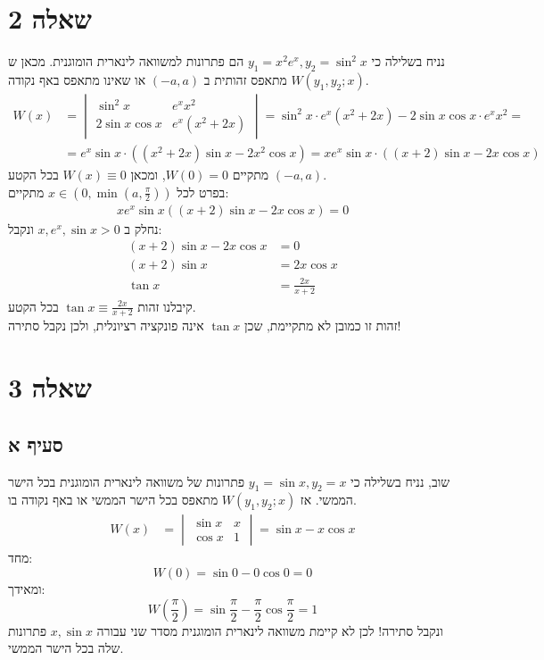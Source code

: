 \documentclass{article}
\begin{document}
\section*{שאלה 2}

נניח בשלילה כי $y_1=x^2e^x, y_2=\sin^2x$ הם פתרונות למשוואה לינארית הומוגנית. מכאן ש $W(y_1,y_2;x)$ מתאפס זהותית ב $(-a,a)$ או שאינו מתאפס באף נקודה.
\begin{align*}
    W(x) & =\begin{vmatrix}
                \sin^2x        & e^xx^2      \\
                2\sin x \cos x & e^x(x^2+2x)
            \end{vmatrix}
    = \sin^2x \cdot e^x(x^2+2x) - 2\sin x \cos x \cdot e^xx^2 =                                      \\
         & = e^x \sin x \cdot ((x^2+2x)\sin x-2x^2\cos x) =xe^x\sin x \cdot ((x+2)\sin x - 2x\cos x)
\end{align*}
מתקיים $W(0)=0$, ומכאן $W(x)\equiv 0$ בכל הקטע $(-a,a)$.\\
בפרט לכל $x\in(0,\min(a, \frac{\pi}{2}))$ מתקיים:
\begin{align*}
    xe^x\sin x ((x+2)\sin x - 2x \cos x) = 0
\end{align*}
נחלק ב $x,e^x,\sin x > 0$ ונקבל:
\begin{align*}
    (x+2)\sin x -2x\cos x & = 0              \\
    (x+2)\sin x           & = 2x\cos x       \\
    \tan x                & = \frac{2x}{x+2}
\end{align*}
קיבלנו זהות $\tan x \equiv \frac{2x}{x+2}$ בכל הקטע. \\
זהות זו כמובן לא מתקיימת, שכן $\tan x$ אינה פונקציה רציונלית, ולכן נקבל סתירה!

\pagebreak

\section*{שאלה 3}

\subsection*{סעיף א}

שוב, נניח בשלילה כי $y_1=\sin x, y_2=x$ פתרונות של משוואה לינארית הומוגנית בכל הישר הממשי. אז $W(y_1,y_2;x)$ מתאפס בכל הישר הממשי או באף נקודה בו.
\begin{align*}
    W(x) & =\begin{vmatrix}
                \sin x & x \\
                \cos x & 1
            \end{vmatrix} = \sin x - x\cos x
\end{align*}
מחד:
\[
    W(0)=\sin 0 - 0\cos 0 = 0
\]
ומאידך:
\[
    W(\frac{\pi}{2})=\sin \frac{\pi}{2} - \frac{\pi}{2} \cos \frac{\pi}{2} = 1
\]
ונקבל סתירה! לכן לא קיימת משוואה לינארית הומוגנית מסדר שני עבורה $x, \sin x$ פתרונות שלה בכל הישר הממשי.
\end{document}
